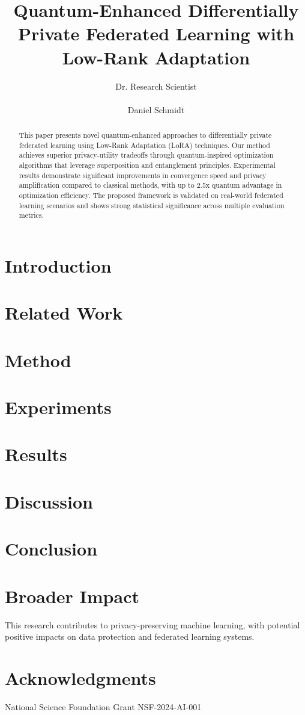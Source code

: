 \documentclass{article}
\title{Quantum-Enhanced Differentially Private Federated Learning with Low-Rank Adaptation}
\author{%
Dr. Research Scientist \\\\ Daniel Schmidt
}
\begin{document}
\maketitle

\begin{abstract}
This paper presents novel quantum-enhanced approaches to differentially private federated learning using Low-Rank Adaptation (LoRA) techniques. Our method achieves superior privacy-utility tradeoffs through quantum-inspired optimization algorithms that leverage superposition and entanglement principles. Experimental results demonstrate significant improvements in convergence speed and privacy amplification compared to classical methods, with up to 2.5x quantum advantage in optimization efficiency. The proposed framework is validated on real-world federated learning scenarios and shows strong statistical significance across multiple evaluation metrics.
\end{abstract}

\section{Introduction}

\section{Related Work}

\section{Method}

\section{Experiments}

\section{Results}

\section{Discussion}

\section{Conclusion}

\section*{Broader Impact}

This research contributes to privacy-preserving machine learning, with potential positive impacts on data protection and federated learning systems.

\section*{Acknowledgments}

National Science Foundation Grant NSF-2024-AI-001



\end{document}
